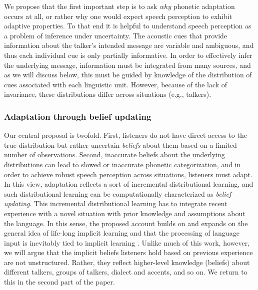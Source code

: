 We propose that the first important step is to ask {\em why} phonetic adaptation occurs at all, or rather why one would expect speech perception to exhibit adaptive properties.
To that end it is helpful to understand speech perception as a problem of inference under uncertainty.
The acoustic cues that provide information about the talker's intended message are variable and ambiguous, and thus each individual cue is only partially informative.
In order to effectively infer the underlying message, information must be integrated from many sources, and as we will discuss below, this must be guided by knowledge of the distribution of cues associated with each linguistic unit.  However, because of the lack of invariance, these distributions differ across situations (e.g., talkers).

\subsubsection{Adaptation through belief updating}
\label{sec:robust-speech-perc}



Our central proposal is twofold.  First, listeners do not have direct access to the true distribution but rather uncertain \emph{beliefs} about them based on a limited number of observations.  Second, inaccurate beliefs about the underlying distributions can lead to slowed or inaccurate phonetic categorization, and in order to achieve robust speech perception across situations, listeners must adapt.  In this view, adaptation reflects a sort of incremental distributional learning,
and such distributional learning can be computationally characterized as \emph{belief updating}. This incremental distributional learning has to integrate recent experience with a novel situation with prior knowledge and assumptions about the language. In this sense, the proposed account builds on and expands on the general idea of life-long implicit learning \autocite{Botvinick2004,Chang2006,Elman1990} and that the processing of language input is inevitably tied to implicit learning \autocite[e.g.,][]{Clark2013,Dell2014,Jaeger2013a}. Unlike much of this work, however, we will argue that the implicit beliefs listeners hold based on previous experience are not unstructured. Rather, they reflect higher-level knowledge (beliefs) about different talkers, groups of talkers, dialect and accents, and so on.  We return to this in the second part of the paper.

